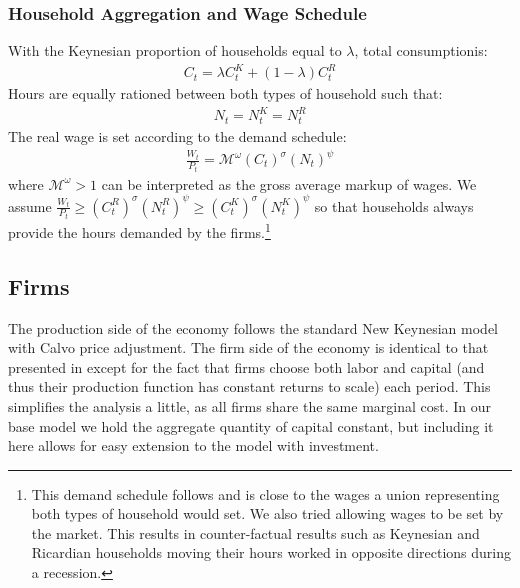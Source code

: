 \documentclass[titlepage]{\econtex}\newcommand{\texname}{ConsumptionHeterogeneity}
\begin{document}

\subsubsection{Household Aggregation and Wage Schedule}
With the Keynesian proportion of households equal to $\lambda$, total consumptionis:
\begin{align}
C_t = \lambda C^K_t + (1-\lambda) C^R_t \label{agg_C}
\end{align}
Hours are equally rationed between both types of household such that:
\begin{align}
N_t = N^K_t = N^R_t	\label{agg_N}
\end{align}
The real wage is set according to the demand schedule:
\begin{align}
\frac{W_t}{P_t} = \mathcal{M}^{\omega} \left(C_t\right)^{\sigma}\left(N_t\right)^{\psi} \label{foc_hours}
\end{align}
where $\mathcal{M}^{\omega}>1$ can be interpreted as the gross average markup of wages. We assume $\frac{W_t}{P_t} \geq \left(C^R_t\right)^{\sigma}\left(N^R_t\right)^{\psi} \geq \left(C^K_t\right)^{\sigma}\left(N^K_t\right)^{\psi}$ so that households always provide the hours demanded by the firms.\footnote{This demand schedule follows \cite{dgHANKTANK} and is close to the wages a union representing both types of household would set. We also tried allowing wages to be set by the market. This results in counter-factual results such as Keynesian and Ricardian households moving their hours worked in opposite directions during a recession.}

\subsection {Firms}
The production side of the economy follows the standard New Keynesian model with Calvo price adjustment. The firm side of the economy is identical to that presented in \cite{gali_book} except for the fact that firms choose both labor and capital (and thus their production function has constant returns to scale) each period. This simplifies the analysis a little, as all firms share the same marginal cost. In our base model we hold the aggregate quantity of capital constant, but including it here allows for easy extension to the model with investment.
\end{document}

